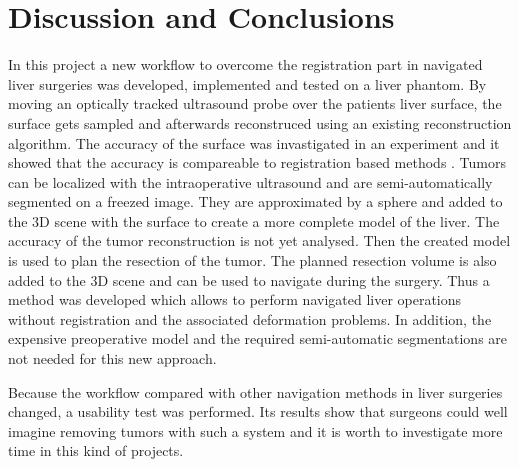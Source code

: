 %
%
%

\chapter{Discussion and Conclusions}
In this project a new workflow to overcome the registration part in navigated
liver surgeries was developed, implemented and tested on a liver phantom. By
moving an optically tracked ultrasound probe over the patients liver surface,
the surface gets sampled and afterwards reconstruced using an existing
reconstruction algorithm. The accuracy of the surface was invastigated in an
experiment and it showed that the accuracy is compareable to registration based
methods \cite{}. Tumors can be localized with the
intraoperative ultrasound and are semi-automatically segmented on
a freezed image. They are approximated by a sphere and added to the 3D scene with
the surface 
to create a more complete model of the liver. The accuracy of the tumor
reconstruction is not yet analysed. Then the created model is used
to plan the resection of the tumor. The planned resection volume is also added to the 3D scene
and can be used to navigate during the surgery. Thus a method was developed
which allows to perform navigated liver operations without registration and the
associated deformation problems. In addition, the expensive preoperative model
and the required semi-automatic segmentations are not needed for this new approach.

Because the workflow compared with other navigation methods in liver surgeries
changed, a usability test was performed. Its results show that surgeons could
well imagine removing tumors with such a system and it is worth to investigate
more time in this kind of projects. 

